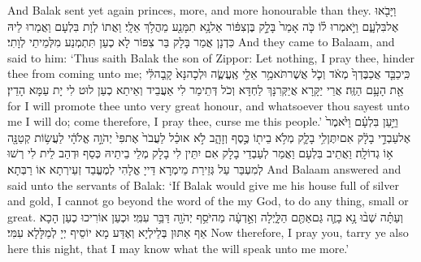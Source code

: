 {And Balak sent yet again princes, more, and more honourable than they.}{}
{וַיָּבֹ֖אוּ אֶל\maqqaf בִּלְעָ֑ם וַיֹּ֣אמְרוּ ל֗וֹ כֹּ֤ה אָמַר֙ בָּלָ֣ק בֶּן\maqqaf צִפּ֔וֹר אַל\maqqaf נָ֥א תִמָּנַ֖ע מֵהֲלֹ֥ךְ אֵלָֽי׃}
{וַאֲתוֹ לְוָת בִּלְעָם וַאֲמַרוּ לֵיהּ כִּדְנָן אֲמַר בָּלָק בַּר צִפּוֹר לָא כְעַן תִּתְמְנַע מִלְּמֵיתֵי לְוָתִי׃}
{And they came to Balaam, and said to him: ‘Thus saith Balak the son of Zippor: Let nothing, I pray thee, hinder thee from coming unto me;}{}
{כִּֽי\maqqaf כַבֵּ֤ד אֲכַבֶּדְךָ֙ מְאֹ֔ד וְכֹ֛ל אֲשֶׁר\maqqaf תֹּאמַ֥ר אֵלַ֖י אֶֽעֱשֶׂ֑ה וּלְכָה\maqqaf נָּא֙ קָֽבָה\maqqaf לִּ֔י אֵ֖ת הָעָ֥ם הַזֶּֽה׃}
{אֲרֵי יַקָּרָא אֲיַקְּרִנָּךְ לַחְדָּא וְכֹל דְּתֵימַר לִי אַעֲבֵיד וְאֵיתַא כְעַן לוּט לִי יָת עַמָּא הָדֵין׃}
{for I will promote thee unto very great honour, and whatsoever thou sayest unto me I will do; come therefore, I pray thee, curse me this people.’}{}
{וַיַּ֣עַן בִּלְעָ֗ם וַיֹּ֙אמֶר֙ אֶל\maqqaf עַבְדֵ֣י בָלָ֔ק אִם\maqqaf יִתֶּן\maqqaf לִ֥י בָלָ֛ק מְלֹ֥א בֵית֖וֹ כֶּ֣סֶף וְזָהָ֑ב לֹ֣א אוּכַ֗ל לַעֲבֹר֙ אֶת\maqqaf פִּי֙ יְהֹוָ֣ה אֱלֹהָ֔י לַעֲשׂ֥וֹת קְטַנָּ֖ה א֥וֹ גְדוֹלָֽה׃}
{וַאֲתֵיב בִּלְעָם וַאֲמַר לְעַבְדֵי בָלָק אִם יִתֵּין לִי בָלָק מְלֵי בֵיתֵיהּ כְּסַף וּדְהַב לֵית לִי רְשׁוּ לְמִעְבַּר עַל גְּזֵירַת מֵימְרָא דַּייָ אֱלָהִי לְמֶעֱבַד זְעֵירְתָא אוֹ רַבְּתָא׃}
{And Balaam answered and said unto the servants of Balak: ‘If Balak would give me his house full of silver and gold, I cannot go beyond the word of the \lord\space my God, to do any thing, small or great.}{}
{וְעַתָּ֗ה שְׁב֨וּ נָ֥א בָזֶ֛ה גַּם\maqqaf אַתֶּ֖ם הַלָּ֑יְלָה וְאֵ֣דְעָ֔ה מַה\maqqaf יֹּסֵ֥ף יְהֹוָ֖ה דַּבֵּ֥ר עִמִּֽי׃}
{וּכְעַן אוֹרִיכוּ כְעַן הָכָא אַף אַתּוּן בְּלֵילְיָא וְאֶדַּע מָא יוֹסֵיף יְיָ לְמַלָּלָא עִמִּי׃}
{Now therefore, I pray you, tarry ye also here this night, that I may know what the \lord\space will speak unto me more.’}{}
